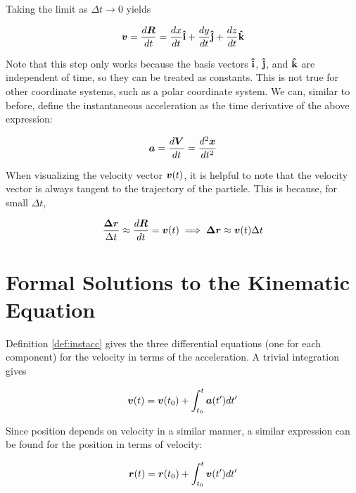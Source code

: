 \documentclass[openany,oneside]{book}
\begin{document}
Taking the limit as $\Delta t \rightarrow 0$ yields

\begin{definition}
    
$$ \lvect{v} =  \frac{d\svect{r}}{dt} = \frac{dx}{dt} \ihat + \frac{dy}{dt} \jhat + \frac{dz}{dt} \khat $$
\end{definition}


Note that this step only works because the basis vectors $\boldsymbol{\hat{\textbf{i}}}$, $\boldsymbol{\hat{\textbf{j}}}$, and $\boldsymbol{\hat{\textbf{k}}}$ are independent of time, so they can be treated as constants. This is not true for other coordinate systems, such as a polar coordinate system. We can, similar to before, define the instantaneous acceleration as the time derivative of the above expression: 


\begin{definition}
    \label{def:instacc}
    $$
        \lvect{a} =  \frac{d\svect{v}}{dt} = \frac{d^2\lvect{x}}{dt^2} 
    $$

\end{definition}

When visualizing the velocity vector $\bm{v}(t)$, it is helpful to note that the velocity vector is always tangent to the trajectory of the particle. This is because, for small $\Delta t$, 

\begin{equation}
\label{eq:parallel}
\frac{\lvect{\Delta r}}{\Delta t} \approx \frac{d\svect{r}}{d t} = \lvect{v}(t) \implies \lvect{\Delta r} \approx \lvect{v}(t) \Delta t
\end{equation}


\section{Formal Solutions to the Kinematic Equation}

Definition \ref{def:instacc} gives the three differential equations (one for each component) for the velocity 
in terms of the acceleration. A trivial integration gives

\begin{align}
    \bm{v}(t) = \bm{v}(t_0) + \int_{t_0}^{t} \bm{a}(t')dt'
    \label{eq:s}
\end{align}

Since position depends on velocity in a similar manner, a similar expression can be found
for the position in terms of velocity: 


\begin{align}
    \bm{r}(t) = \bm{r}(t_0) + \int_{t_0}^{t} \bm{v}(t')dt'
    \label{eq:t} 
\end{align}
\end{document}
